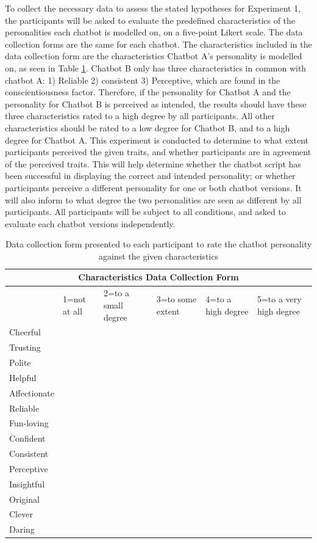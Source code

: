 To collect the necessary data to assess the stated hypotheses for Experiment 1, the participants will be asked to evaluate the predefined characteristics of the personalities each chatbot is modelled on, on a five-point Likert scale. The data collection forms are the same for each chatbot. The characteristics included in the data collection form are the characteristics Chatbot A's personality is modelled on, as seen in Table \ref{tab:datacolchar}. Chatbot B only has three characteristics in common with chatbot A: 1) Reliable 2) consistent 3) Perceptive, which are found in the conscientiousness factor. Therefore, if the personality for Chatbot A and the personality for Chatbot B is perceived as intended, the results should have these three characteristics rated to a high degree by all participants. All other characteristics should be rated to a low degree for Chatbot B, and to a high degree for Chatbot A. This experiment is conducted to determine to what extent participants perceived the given traits, and whether participants are in agreement of the perceived traits. This will help determine whether the chatbot script has been successful in displaying the correct and intended personality; or whether participants perceive a different personality for one or both chatbot versions. It will also inform to what degree the two personalities are seen as different by all participants. All participants will be subject to all conditions, and asked to evaluate each chatbot versions independently. 

\vspace{2,5mm}

\begin{table}[h]
    \centering
\begin{tabular}{|p{2cm}|p{2cm}|p{2cm}|p{2cm}|p{2cm}|p{2cm}|}
 \hline
 \multicolumn{6}{|c|}{Characteristics Data Collection Form} \\
 \hline
& 1=not at all & 2=to a small degree & 3=to some extent & 4=to a high degree & 5=to a very high degree \\
\hline
Cheerful & & & & & \\
\hline
Trusting & & & & & \\
\hline
Polite & & & & & \\
\hline
Helpful & & & & & \\
\hline
Affectionate & & & & & \\
\hline
Reliable & & & & & \\
\hline
Fun-loving & & & & & \\
\hline
Confident & & & & & \\
\hline
Consistent & & & & & \\
\hline
Perceptive & & & & & \\
\hline
Insightful & & & & & \\
\hline
Original & & & & & \\
\hline
Clever & & & & & \\
\hline
Daring & & & & & \\
\hline
\end{tabular}
 \caption{Data collection form presented to each participant to rate the chatbot personality against the given characteristics}
    \label{tab:datacolchar}
\end{table}


